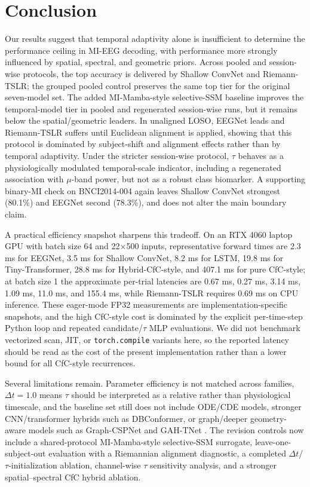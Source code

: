 \documentclass[journal]{IEEEtran}
\begin{document}
\section{Conclusion}

Our results suggest that temporal adaptivity alone is insufficient to determine the performance ceiling in MI-EEG decoding, with performance more strongly influenced by spatial, spectral, and geometric priors. Across pooled and session-wise protocols, the top accuracy is delivered by Shallow ConvNet and Riemann-TSLR; the grouped pooled control preserves the same top tier for the original seven-model set. The added MI-Mamba-style selective-SSM baseline improves the temporal-model tier in pooled and regenerated session-wise runs, but it remains below the spatial/geometric leaders. In unaligned LOSO, EEGNet leads and Riemann-TSLR suffers until Euclidean alignment is applied, showing that this protocol is dominated by subject-shift and alignment effects rather than by temporal adaptivity. Under the stricter session-wise protocol, $\tau$ behaves as a physiologically modulated temporal-scale indicator, including a regenerated association with $\mu$-band power, but not as a robust class biomarker. A supporting binary-MI check on BNCI2014-004 again leaves Shallow ConvNet strongest (80.1\%) and EEGNet second (78.3\%), and does not alter the main boundary claim.

A practical efficiency snapshot sharpens this tradeoff. On an RTX 4060 laptop GPU with batch size 64 and 22$\times$500 inputs, representative forward times are 2.3 ms for EEGNet, 3.5 ms for Shallow ConvNet, 8.2 ms for LSTM, 19.8 ms for Tiny-Transformer, 28.8 ms for Hybrid-CfC-style, and 407.1 ms for pure CfC-style; at batch size 1 the approximate per-trial latencies are 0.67 ms, 0.27 ms, 3.14 ms, 1.09 ms, 11.0 ms, and 155.4 ms, while Riemann-TSLR requires 0.69 ms on CPU inference. These eager-mode FP32 measurements are implementation-specific snapshots, and the high CfC-style cost is dominated by the explicit per-time-step Python loop and repeated candidate/$\tau$ MLP evaluations. We did not benchmark vectorized scan, JIT, or \texttt{torch.compile} variants here, so the reported latency should be read as the cost of the present implementation rather than a lower bound for all CfC-style recurrences.

Several limitations remain. Parameter efficiency is not matched across families, $\Delta t=1.0$ means $\tau$ should be interpreted as a relative rather than physiological timescale, and the baseline set still does not include ODE/CDE models, stronger CNN/transformer hybrids such as DBConformer, or graph/deeper geometry-aware models such as Graph-CSPNet and GAH-TNet \cite{gu2023mamba,gui2024eegmamba,guo2025mimamba,wang2025dbconformer,ingolfsson2020eegtcnet,elouahidi2024simpleconv,li2024ctnet,han2024eegcct,ju2022graphcspnet,han2025gahtnet}. The revision controls now include a shared-protocol MI-Mamba-style selective-SSM surrogate, leave-one-subject-out evaluation with a Riemannian alignment diagnostic, a completed $\Delta t$/$\tau$-initialization ablation, channel-wise $\tau$ sensitivity analysis, and a stronger spatial--spectral CfC hybrid ablation.
\end{document}
